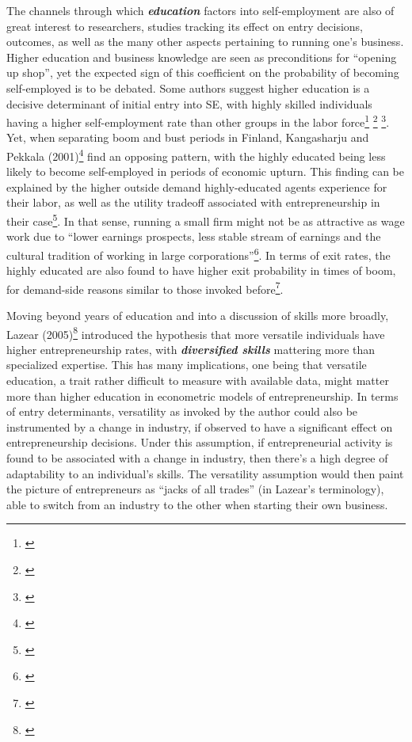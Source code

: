The channels through which \textbf{\textit{education}} factors into self-employment are also of great interest to researchers, studies tracking its effect on entry decisions, outcomes, as well as the many other aspects pertaining to running one's business. Higher education and business knowledge are seen as preconditions for ``opening up shop'', yet the expected sign of this coefficient on the probability of becoming self-employed is to be debated. Some authors suggest higher education is a decisive determinant of initial entry into SE, with highly skilled individuals having a higher self-employment rate than other groups in the labor force\footnote{\cite{rees1986empirical}}\hspace{.15em} \footnote{\cite{robinson1994effect}}\hspace{.15em} \footnote{\cite{luber2000growing}}. Yet, when separating boom and bust periods in Finland, Kangasharju and Pekkala (2001)\footnote{\cite{kangasharju2001regional}} find an opposing pattern, with the highly educated being less likely to become self-employed in periods of economic upturn. This finding can be explained by the higher outside demand highly-educated agents experience for their labor, as well as the utility tradeoff associated with entrepreneurship in their case\footnote{\cite{kangasharju2001regional}}. In that sense, running a small firm might not be as attractive as wage work due to ``lower earnings prospects, less stable stream of earnings and the cultural tradition of working in large corporations''\footnote{\cite{kangasharju2001regional}}. In terms of exit rates, the highly educated are also found to have higher exit probability in times of boom, for demand-side reasons similar to those invoked before\footnote{\cite{kangasharju2001regional}}.

Moving beyond years of education and into a discussion of skills more broadly, Lazear (2005)\footnote{\cite{Lazear2005}} introduced the hypothesis that more versatile individuals have higher entrepreneurship rates, with \textbf{\textit{diversified skills}} mattering more than specialized expertise. This has many implications, one being that versatile education, a trait rather difficult to measure with available data, might matter more than higher education in econometric models of entrepreneurship. In terms of entry determinants, versatility as invoked by the author could also be instrumented by a change in industry, if observed to have a significant effect on entrepreneurship decisions. Under this assumption, if entrepreneurial activity is found to be associated with a change in industry, then there's a high degree of adaptability to an individual's skills. The versatility assumption would then paint the picture of entrepreneurs as ``jacks of all trades'' (in Lazear's terminology), able to switch from an industry to the other when starting their own business.

